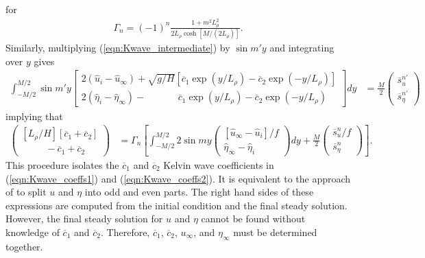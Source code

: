 \documentclass[10pt,reqno]{amsart}
\begin{document}
for 
\begin{align}
\Gamma_n = (-1)^{n} \frac{1 + m^2 L_\rho^2 }{ 2 L_\rho \cosh \left[ M/(2 L_\rho) \right]} .
\label{eqn:Gamma_def}
\end{align}
Similarly, multiplying (\ref{eqn:Kwave_intermediate}) by $\sin m' y $ and integrating over $y$ gives
\begin{align}
\int_{-M/2}^{M/2}  \sin m' y
\begin{bmatrix} 
2 \left( \hat{u}_i - \hat{u}_\infty \right) +\sqrt{g/H} \left[ \overline{c}_1 \exp \left( y/L_\rho \right) - \overline{c}_2 \exp \left( - y/L_\rho \right) \right]\\
2 \left( \hat{\eta}_i - \hat{\eta}_\infty \right) - \;\;\;\;\; \;\; \;\;\;\;\; \overline{c}_1 \exp  \left( y/L_\rho \right) - \overline{c}_2 \exp \left( - y/L_\rho \right)
\end{bmatrix}  dy & = \frac{M}{2} 
\begin{pmatrix} 
\overline{s}_u^{n'} \\ 
\overline{s}_\eta^{n'}
\end{pmatrix} 
\end{align}
implying that
\begin{align}
\begin{pmatrix} 
[L_\rho / H] \left[ \overline{c}_1 + \overline{c}_2  \right]\\
 \;\;\;\;\; \;\; \;\; - \overline{c}_1 + \overline{c}_2 
\end{pmatrix}  &= 
\Gamma_n
\left[ \int_{-M/2}^{M/2} 2 \sin m y
\begin{pmatrix} 
\left[ \hat{u}_\infty - \hat{u}_i \right] / f\\
\hat{\eta}_\infty - \hat{\eta}_i
\end{pmatrix}  dy +
\frac{ M}{2} \begin{pmatrix} 
\overline{s}_u^n / f \\ 
\overline{s}_\eta^n
\end{pmatrix}\right] .
\label{eqn:Kwave_coeffs2}
\end{align}
This procedure isolates the $\overline{c}_1$ and $\overline{c}_2$ Kelvin wave coefficients in (\ref{eqn:Kwave_coeffs1}) and (\ref{eqn:Kwave_coeffs2}).
It is equivalent to the approach of \citet{gill76} to split $u$ and $\eta$ into odd and even parts.
The right hand sides of these expressions are computed from the initial condition and the final steady solution.
However, the final steady solution for $u$ and $\eta$ cannot be found without knowledge of $\overline{c}_1$ and $\overline{c}_2$.
Therefore, $\overline{c}_1$, $\overline{c}_2$, $u_\infty$, and $\eta_\infty$ must be determined together.
\end{document}
